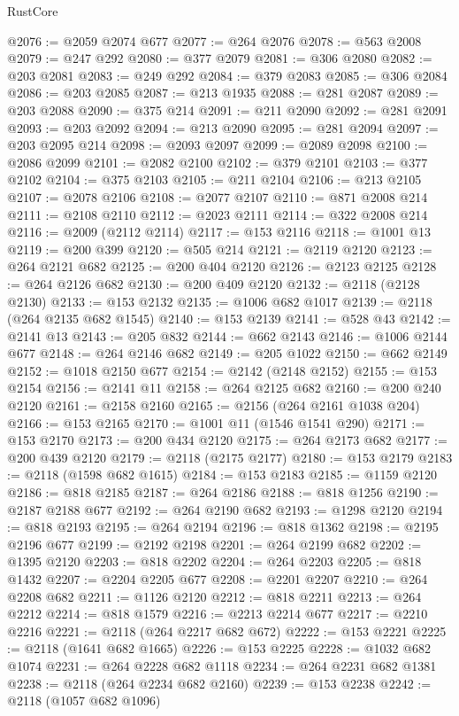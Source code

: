 \begin{lexlean}{RustCore}
\begin{coremodule}
@2076 := @2059 @2074 @677
@2077 := @264 @2076
@2078 := @563 @2008
@2079 := @247 @292
@2080 := @377 @2079
@2081 := @306 @2080
@2082 := @203 @2081
@2083 := @249 @292
@2084 := @379 @2083
@2085 := @306 @2084
@2086 := @203 @2085
@2087 := @213 @1935
@2088 := @281 @2087
@2089 := @203 @2088
@2090 := @375 @214
@2091 := @211 @2090
@2092 := @281 @2091
@2093 := @203 @2092
@2094 := @213 @2090
@2095 := @281 @2094
@2097 := @203 @2095 @214
@2098 := @2093 @2097
@2099 := @2089 @2098
@2100 := @2086 @2099
@2101 := @2082 @2100
@2102 := @379 @2101
@2103 := @377 @2102
@2104 := @375 @2103
@2105 := @211 @2104
@2106 := @213 @2105
@2107 := @2078 @2106
@2108 := @2077 @2107
@2110 := @871 @2008 @214
@2111 := @2108 @2110
@2112 := @2023 @2111
@2114 := @322 @2008 @214
@2116 := @2009 (@2112 @2114)
@2117 := @153 @2116
@2118 := @1001 @13
@2119 := @200 @399
@2120 := @505 @214
@2121 := @2119 @2120
@2123 := @264 @2121 @682
@2125 := @200 @404 @2120
@2126 := @2123 @2125
@2128 := @264 @2126 @682
@2130 := @200 @409 @2120
@2132 := @2118 (@2128 @2130)
@2133 := @153 @2132
@2135 := @1006 @682 @1017
@2139 := @2118 (@264 @2135 @682 @1545)
@2140 := @153 @2139
@2141 := @528 @43
@2142 := @2141 @13
@2143 := @205 @832
@2144 := @662 @2143
@2146 := @1006 @2144 @677
@2148 := @264 @2146 @682
@2149 := @205 @1022
@2150 := @662 @2149
@2152 := @1018 @2150 @677
@2154 := @2142 (@2148 @2152)
@2155 := @153 @2154
@2156 := @2141 @11
@2158 := @264 @2125 @682
@2160 := @200 @240 @2120
@2161 := @2158 @2160
@2165 := @2156 (@264 @2161 @1038 @204)
@2166 := @153 @2165
@2170 := @1001 @11 (@1546 @1541 @290)
@2171 := @153 @2170
@2173 := @200 @434 @2120
@2175 := @264 @2173 @682
@2177 := @200 @439 @2120
@2179 := @2118 (@2175 @2177)
@2180 := @153 @2179
@2183 := @2118 (@1598 @682 @1615)
@2184 := @153 @2183
@2185 := @1159 @2120
@2186 := @818 @2185
@2187 := @264 @2186
@2188 := @818 @1256
@2190 := @2187 @2188 @677
@2192 := @264 @2190 @682
@2193 := @1298 @2120
@2194 := @818 @2193
@2195 := @264 @2194
@2196 := @818 @1362
@2198 := @2195 @2196 @677
@2199 := @2192 @2198
@2201 := @264 @2199 @682
@2202 := @1395 @2120
@2203 := @818 @2202
@2204 := @264 @2203
@2205 := @818 @1432
@2207 := @2204 @2205 @677
@2208 := @2201 @2207
@2210 := @264 @2208 @682
@2211 := @1126 @2120
@2212 := @818 @2211
@2213 := @264 @2212
@2214 := @818 @1579
@2216 := @2213 @2214 @677
@2217 := @2210 @2216
@2221 := @2118 (@264 @2217 @682 @672)
@2222 := @153 @2221
@2225 := @2118 (@1641 @682 @1665)
@2226 := @153 @2225
@2228 := @1032 @682 @1074
@2231 := @264 @2228 @682 @1118
@2234 := @264 @2231 @682 @1381
@2238 := @2118 (@264 @2234 @682 @2160)
@2239 := @153 @2238
@2242 := @2118 (@1057 @682 @1096)

\end{coremodule}
\end{lexlean}
